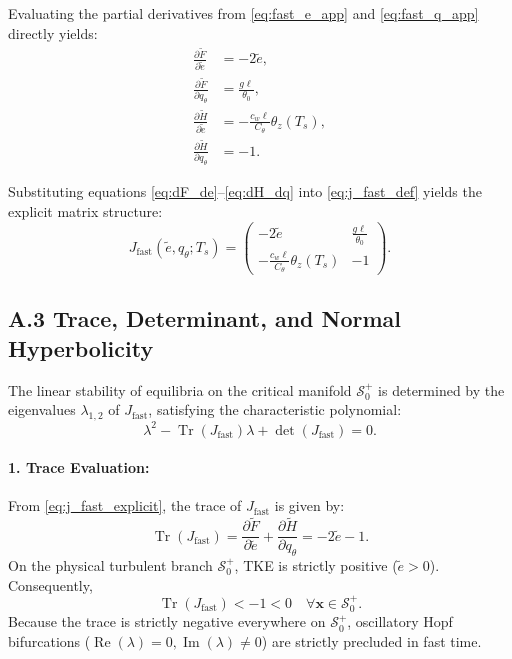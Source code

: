 Evaluating the partial derivatives from \eqref{eq:fast_e_app} and \eqref{eq:fast_q_app} directly yields:
\begin{align}
\frac{\partial \tilde{F}}{\partial \tilde e} &= -2\tilde e, \label{eq:dF_de} \\[4pt]
\frac{\partial \tilde{F}}{\partial q_\theta} &= \frac{g \ell}{\theta_0}, \label{eq:dF_dq} \\[4pt]
\frac{\partial \tilde{H}}{\partial \tilde e} &= -\frac{c_w \ell}{C_\theta} \theta_z(T_s), \label{eq:dH_de} \\[4pt]
\frac{\partial \tilde{H}}{\partial q_\theta} &= -1. \label{eq:dH_dq}
\end{align}

Substituting equations \eqref{eq:dF_de}--\eqref{eq:dH_dq} into \eqref{eq:j_fast_def} yields the explicit matrix structure:
\begin{equation}
J_{\mathrm{fast}}(\tilde e, q_\theta; T_s) = 
\begin{pmatrix}
-2\tilde e & \frac{g \ell}{\theta_0} \\[6pt]
-\frac{c_w \ell}{C_\theta} \theta_z(T_s) & -1
\end{pmatrix}.
\label{eq:j_fast_explicit}
\end{equation}

\subsection*{A.3 Trace, Determinant, and Normal Hyperbolicity}

The linear stability of equilibria on the critical manifold $\mathcal{S}_0^+$ is determined by the eigenvalues $\lambda_{1,2}$ of $J_{\mathrm{fast}}$, satisfying the characteristic polynomial:
\begin{equation}
\lambda^2 - \operatorname{Tr}(J_{\mathrm{fast}})\lambda + \det(J_{\mathrm{fast}}) = 0.
\end{equation}

\paragraph{1. Trace Evaluation:}
From \eqref{eq:j_fast_explicit}, the trace of $J_{\mathrm{fast}}$ is given by:
\begin{equation}
\operatorname{Tr}(J_{\mathrm{fast}}) = \frac{\partial \tilde{F}}{\partial \tilde e} + \frac{\partial \tilde{H}}{\partial q_\theta} = -2\tilde e - 1.
\label{eq:trace_eval}
\end{equation}
On the physical turbulent branch $\mathcal{S}_0^+$, TKE is strictly positive ($\tilde e > 0$). Consequently,
\begin{equation}
\operatorname{Tr}(J_{\mathrm{fast}}) < -1 < 0 \quad \forall \mathbf{x} \in \mathcal{S}_0^+.
\end{equation}
Because the trace is strictly negative everywhere on $\mathcal{S}_0^+$, oscillatory Hopf bifurcations ($\operatorname{Re}(\lambda) = 0, \operatorname{Im}(\lambda) \neq 0$) are strictly precluded in fast time.

